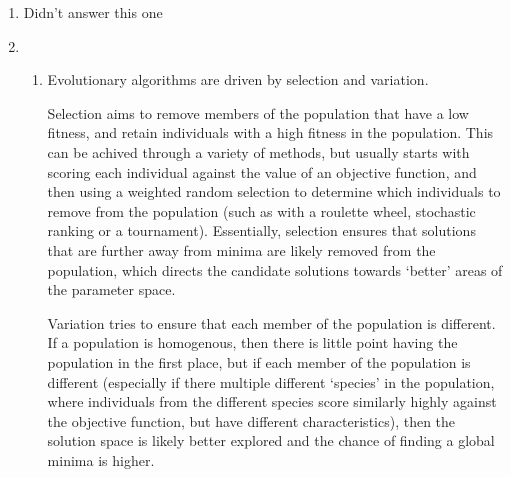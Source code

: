 \documentclass{report}
\begin{document}
\begin{enumerate}
\item Didn't answer this one
\item
  \begin{enumerate}
  \item Evolutionary algorithms are driven by selection and variation.

    Selection aims to remove members of the population that have a low
    fitness, and retain individuals with a high fitness in the
    population. This can be achived through a variety of methods, but
    usually starts with scoring each individual against the value of
    an objective function, and then using a weighted random selection
    to determine which individuals to remove from the population (such
    as with a roulette wheel, stochastic ranking or a
    tournament). Essentially, selection ensures that solutions that
    are further away from minima are likely removed from the
    population, which directs the candidate solutions towards `better'
    areas of the parameter space.

    Variation tries to ensure that each member of the population is
    different. If a population is homogenous, then there is little
    point having the population in the first place, but if each member
    of the population is different (especially if there multiple
    different `species' in the population, where individuals from the
    different species score similarly highly against the objective
    function, but have different characteristics), then the solution
    space is likely better explored and the chance of finding a global
    minima is higher.
  \end{enumerate}
\end{enumerate}
\end{document}
